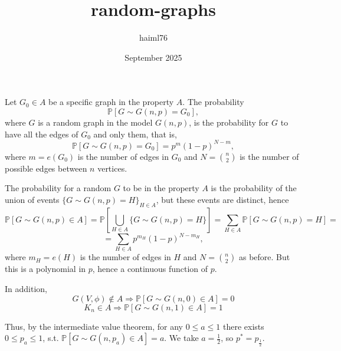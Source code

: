 \documentclass{article}
\title{random-graphs}
\author{haiml76 }
\date{September 2025}
\begin{document}
\maketitle

\section{}
\subsection{}
Let $G_0\in{A}$ be a specific graph in the property $A$. The probability \[\mathbb{P}[G\sim{G(n,p)}=G_0],\]
where $G$ is a random graph in the model $G(n,p)$, is the probability for $G$ to have all the edges of $G_0$ and only them, that is,
\[\mathbb{P}[G\sim{G(n,p)}=G_0]=p^m(1-p)^{N-m},\]
where $m=e(G_0)$ is the number of edges in $G_0$ and $N=\binom{n}{2}$ is the number of possible edges between $n$ vertices.

The probability for a random $G$ to be in the property $A$ is the probability of the union of events $\{G\sim{G(n,p)}=H\}_{H\in{A}}$, but these events are distinct, hence \[\mathbb{P}[G\sim{G(n,p)}\in{A}]=\mathbb{P}[\bigcup_{H\in{A}}\{G\sim{G(n,p)}=H\}]=\sum_{H\in{A}}\mathbb{P}[G\sim{G(n,p)}=H]=\]\[=\sum_{H\in{A}}p^{m_H}(1-p)^{N-m_H},\]
where $m_H=e(H)$ is the number of edges in $H$ and $N=\binom{n}{2}$ as before. But this is a polynomial in $p$, hence a continuous function of $p$. 

In addition,
\[G(V,\phi)\notin{A}\Rightarrow\mathbb{P}[G\sim{G(n,0)}\in{A}]=0\]\[K_n\in{A}\Rightarrow\mathbb{P}[G\sim{G(n,1)}\in{A}]=1\]

Thus, by the intermediate value theorem, for any $0\leq{a}\leq{1}$ there exists $0\leq{p_a}\leq{1}$, s.t. $\mathbb{P}[G\sim{G(n,p_a)}\in{A}]=a$. We take $a=\frac{1}{2}$, so $p^\ast=p_\frac{1}{2}$.
\section{}
\section{}
\section{}
\end{document}
